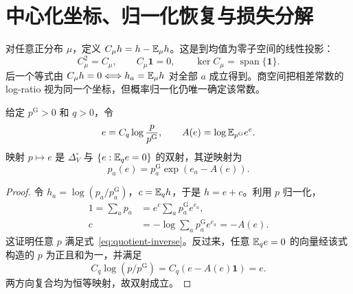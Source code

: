 \section{中心化坐标、归一化恢复与损失分解}
\label{sec:inner-quotient}
对任意正分布 $\mu$，定义 $C_\mu h=h-\mathbb E_\mu h$。这是到均值为零子空间的线性投影：
\begin{equation}
C_\mu^2=C_\mu,\qquad C_\mu\mathbf1=0,\qquad
\ker C_\mu=\operatorname{span}\{\mathbf1\}.
\end{equation}
后一个等式由 $C_\mu h=0\Longleftrightarrow h_a=\mathbb E_\mu h$ 对全部 $a$ 成立得到。商空间把相差常数的 log-ratio 视为同一个坐标，但概率归一化仍唯一确定该常数。

\begin{theorem}[归一化分布与中心化误差的一一对应]
\label{thm:quotient-bijection}
给定 $p^{\mathrm G}>0$ 和 $q>0$，令
\begin{equation}
e=C_q\log\frac{p}{p^{\mathrm G}},\qquad
A(e)=\log\mathbb E_{p^{\mathrm G}}e^{e}.
\end{equation}
映射 $p\mapsto e$ 是 $\Delta_V^\circ$ 与 $\{e:\mathbb E_q e=0\}$ 的双射，其逆映射为
\begin{equation}
p_a(e)=p_a^{\mathrm G}\exp(e_a-A(e)).
\label{eq:quotient-inverse}
\end{equation}
\end{theorem}
\begin{proof}
令 $h_a=\log(p_a/p_a^{\mathrm G})$，$c=\mathbb E_qh$，于是 $h=e+c$。利用 $p$ 归一化，
\begin{align}
1=\sum_a p_a&=e^c\sum_a p_a^{\mathrm G}e^{e_a},\\
c&=-\log\sum_a p_a^{\mathrm G}e^{e_a}=-A(e).
\end{align}
这证明任意 $p$ 满足式~\eqref{eq:quotient-inverse}。反过来，任意 $\mathbb E_q e=0$ 的向量经该式构造的 $p$ 为正且和为一，并满足
\begin{equation}
C_q\log(p/p^{\mathrm G})=C_q(e-A(e)\mathbf1)=e.
\end{equation}
两方向复合均为恒等映射，故双射成立。
\end{proof}

